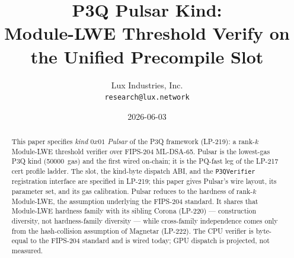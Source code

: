 \documentclass[11pt,a4paper]{article}
\title{P3Q Pulsar Kind:\\
       Module-LWE Threshold Verify on the Unified Precompile Slot}
\author{Lux Industries, Inc. \\
        \texttt{research@lux.network}}
\date{2026-06-03}
\begin{document}
\luxcoverpage

\begin{abstract}
This paper specifies \emph{kind $0x01$ Pulsar} of the P3Q
framework (LP-219): a rank-$k$ Module-LWE threshold verifier over
FIPS-204 ML-DSA-65. Pulsar is the lowest-gas P3Q kind
(\SI{50000}{gas}) and the first wired on-chain; it is the
PQ-fast leg of the LP-217 cert profile ladder. The slot, the
kind-byte dispatch ABI, and the \texttt{P3QVerifier} registration
interface are specified in LP-219; this paper gives Pulsar's wire
layout, its parameter set, and its gas calibration. Pulsar
reduces to the hardness of rank-$k$ Module-LWE, the assumption
underlying the FIPS-204 standard. It shares that Module-LWE
hardness family with its sibling Corona (LP-220) --- construction
diversity, not hardness-family diversity --- while cross-family
independence comes only from the hash-collision assumption of
Magnetar (LP-222). The CPU verifier is
byte-equal to the FIPS-204 standard and is wired today; GPU
dispatch is projected, not measured.
\end{abstract}

\tableofcontents
\newpage






\end{document}
